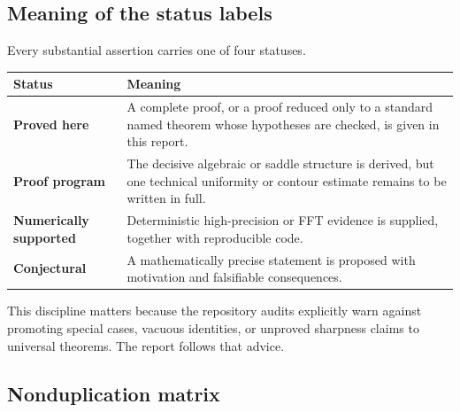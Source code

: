 \documentclass[11pt]{article}
\theoremstyle{definition}
\theoremstyle{remark}
\begin{document}
\subsection{Meaning of the status labels}

Every substantial assertion carries one of four statuses.
\begin{center}
\begin{tabularx}{0.94\textwidth}{>{\bfseries}l X}
\toprule
Status & Meaning\\
\midrule
Proved here & A complete proof, or a proof reduced only to a standard named theorem whose hypotheses are checked, is given in this report.\\
Proof program & The decisive algebraic or saddle structure is derived, but one technical uniformity or contour estimate remains to be written in full.\\
Numerically supported & Deterministic high-precision or FFT evidence is supplied, together with reproducible code.\\
Conjectural & A mathematically precise statement is proposed with motivation and falsifiable consequences.\\
\bottomrule
\end{tabularx}
\end{center}

This discipline matters because the repository audits explicitly warn against promoting special cases, vacuous identities, or unproved sharpness claims to universal theorems.  The report follows that advice.

\subsection{Nonduplication matrix}
\end{document}
